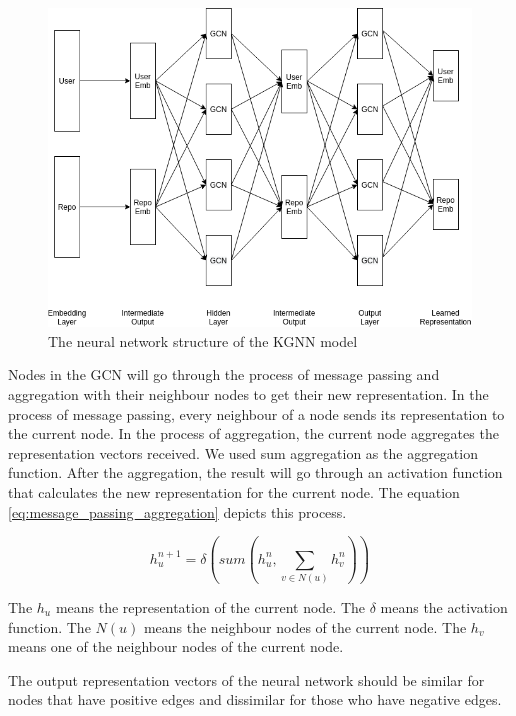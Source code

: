 \documentclass[11pt,twoside]{report}
\begin{document}
\begin{figure}[H]
    \centering
    \includegraphics[scale=0.6]{KGCN Structure.png}
    \caption{The neural network structure of the KGNN model}
    \label{fig:kgnn_structure}
\end{figure}

Nodes in the GCN will go through the process of message passing and aggregation with their neighbour nodes to get their new representation. In the process of message passing, every neighbour of a node sends its representation to the current node. In the process of aggregation, the current node aggregates the representation vectors received. We used sum aggregation as the aggregation function. After the aggregation, the result will go through an activation function that calculates the new representation for the current node. The equation \ref{eq:message_passing_aggregation} depicts this process.

\begin{equation}
    h_u^{n+1}=\delta(sum(h_u^n, \sum_{v\in{N(u)}}h_v^n))
    \label{eq:message_passing_aggregation}
\end{equation}

The $h_u$ means the representation of the current node. The $\delta$ means the activation function. The $N(u)$ means the neighbour nodes of the current node. The $h_v$ means one of the neighbour nodes of the current node.

The output representation vectors of the neural network should be similar for nodes that have positive edges and dissimilar for those who have negative edges.
\end{document}
